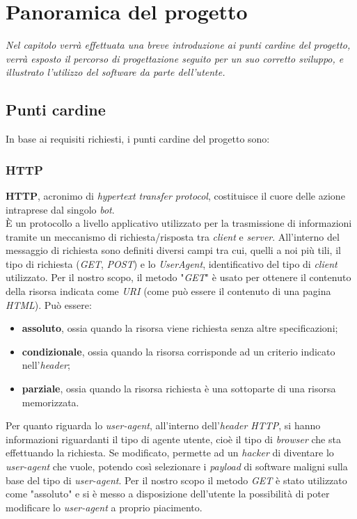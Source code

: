 \chapter{Panoramica del progetto}
\begin{minipage}{12cm}\textit{Nel capitolo verr\`{a} effettuata una breve introduzione ai punti cardine del progetto, verr\`{a} esposto il percorso di progettazione seguito per un suo corretto sviluppo, e illustrato l'utilizzo del software da parte dell'utente.}
\end{minipage}

\vspace*{1cm}
\section{Punti cardine}
In base ai requisiti richiesti, i punti cardine del progetto sono:

\vspace*{0.5cm}
\subsection{HTTP}
\textbf{HTTP}, acronimo di \textit{hypertext transfer protocol}, costituisce il cuore delle azione intraprese dal singolo \textit{bot}.\\
\`E un protocollo a livello applicativo utilizzato per la
trasmissione di informazioni tramite un meccanismo di richiesta/risposta tra \textit{client} e \textit{server}. All'interno del messaggio di richiesta sono definiti diversi campi tra cui, quelli a noi pi\`u tili, il tipo di
richiesta (\textit{GET}, \textit{POST}) e lo \textit{UserAgent}, identificativo del tipo di \textit{client} utilizzato.
Per il nostro scopo, il metodo "\textit{GET}" \`e usato per ottenere il contenuto della risorsa indicata come \textit{URI} (come pu\`o essere il contenuto di una pagina \textit{HTML}). Pu\`o essere:
\begin{itemize}
\item \textbf{assoluto}, ossia quando la risorsa viene richiesta senza altre specificazioni;
\item \textbf{condizionale}, ossia quando la risorsa corrisponde ad un criterio indicato nell'\textit{header};
\item \textbf{parziale}, ossia quando la risorsa richiesta \`e una sottoparte di una risorsa memorizzata.
\end{itemize}
Per quanto riguarda lo \textit{user-agent}, all'interno dell'\textit{header HTTP}, si hanno informazioni riguardanti il tipo di agente utente, cio\`e il tipo di \textit{browser} che sta effettuando la richiesta. Se modificato, permette ad un \textit{hacker} di diventare lo \textit{user-agent} che vuole, potendo cos\`i selezionare i \textit{payload} di software maligni sulla base del tipo di \textit{user-agent}. 
Per il nostro scopo il metodo \textit{GET} \`e stato utilizzato come "assoluto" e si \`e messo a disposizione dell'utente la possibilit\`a di poter modificare lo \textit{user-agent} a proprio piacimento.

